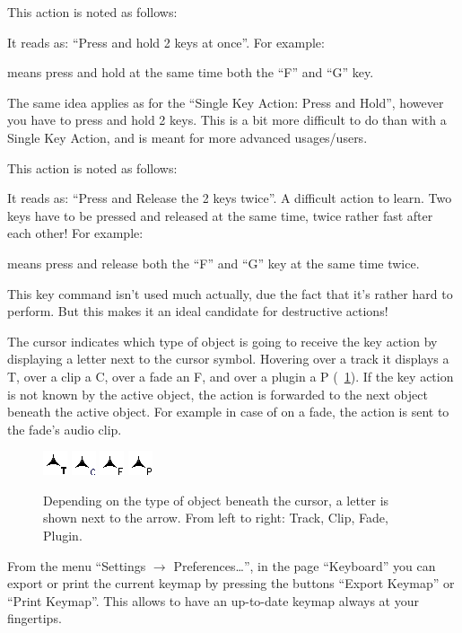 This action is noted as follows:
\begin{quotation}
\end{quotation}
It reads as: ``Press and hold 2 keys at once''. For example:
\begin{quotation}
\end{quotation}
means press and hold at the same time both the ``F'' and ``G'' key.

The same idea applies as for the ``Single Key Action: Press and Hold'', however you have to press and hold 2 keys. This is a bit more difficult to do than with a Single Key Action, and is meant for more advanced usages/users.

 This action is noted as follows:
\begin{quotation}
\end{quotation}
It reads as: ``Press and Release the 2 keys twice''. A difficult action to learn. Two keys have to be pressed and released at the same time, twice rather fast after each other! For example:
\begin{quotation}
\end{quotation}
means press and release both the ``F'' and ``G'' key at the same time twice.

This key command isn't used much actually, due the fact that it's rather hard to perform. But this makes it an ideal candidate for destructive actions!

The cursor indicates which type of object is going to receive the key action by displaying a letter next to the cursor symbol. Hovering over a track it displays a T, over a clip a C, over a fade an F, and over a plugin a P (\FigB~\ref{fig_cursor}). If the key action is not known by the active object, the action is forwarded to the next object beneath the active object. For example in case of  on a fade, the action is sent to the fade's audio clip.

\begin{figure}[t]
 \centering
 \includegraphics[height=2\baselineskip]{../images/cursorFloatOverTrack.png}\qquad
 \includegraphics[height=2\baselineskip]{../images/cursorFloatOverClip.png}\qquad
 \includegraphics[height=2\baselineskip]{../images/cursorFloatOverFade.png}\qquad
 \includegraphics[height=2\baselineskip]{../images/cursorFloatOverPlugin.png}
 \caption{Depending on the type of object beneath the cursor, a letter is shown next to the arrow. From left to right: Track, Clip, Fade, Plugin.}
 \label{fig_cursor}
\end{figure}


From the menu ``Settings $\rightarrow$ Preferences\dots'', in the page ``Keyboard'' you can export or print the current keymap by pressing the buttons ``Export Keymap'' or ``Print Keymap''. This allows to have an up-to-date keymap always at your fingertips.